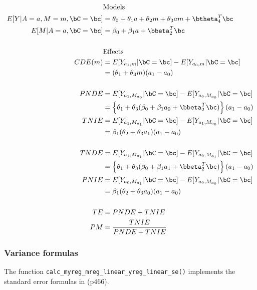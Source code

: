 \documentclass[dvipdfmx,10pt]{article}
\begin{document}
\begin{align*}
  &\text{Models}\\
  E[Y|A=a,M=m,\bC=\bc] &= \theta_{0} + \theta_{1}a + \theta_{2}m + \theta_{3}am + \btheta_{4}^{T}\bc\\
  E[M|A=a,\bC=\bc] &= \beta_{0} + \beta_{1}a + \bbeta_{2}^{T}\bc\\
  \\
  &\text{Effects}\\
  CDE(m) &= E[Y_{a_{1},m} | \bC = \bc] - E[Y_{a_{0},m} | \bC = \bc]\\
  &= (\theta_{1} + \theta_{3}m)(a_{1} - a_{0})\\
  \\
  PNDE &= E[Y_{a_{1},M_{a_{0}}} | \bC = \bc] - E[Y_{a_{0},M_{a_{0}}} | \bC = \bc]\\
  &= \left\{ \theta_{1} + \theta_{3}(\beta_{0} + \beta_{1}a_{0} + \bbeta_{2}^{T}\bc) \right\} (a_{1} - a_{0})\\
  TNIE &= E[Y_{a_{1},M_{a_{1}}} | \bC = \bc] - E[Y_{a_{1},M_{a_{0}}} | \bC = \bc]\\
  &= \beta_{1}(\theta_{2} + \theta_{3}a_{1})(a_{1} - a_{0})\\
  \\
  TNDE &= E[Y_{a_{1},M_{a_{1}}} | \bC = \bc] - E[Y_{a_{0},M_{a_{1}}} | \bC = \bc]\\
  &= \left\{ \theta_{1} + \theta_{3}(\beta_{0} + \beta_{1}a_{1} + \bbeta_{2}^{T}\bc) \right\} (a_{1} - a_{0})\\
  PNIE &= E[Y_{a_{0},M_{a_{1}}} | \bC = \bc] - E[Y_{a_{0},M_{a_{0}}} | \bC = \bc]\\
  &= \beta_{1}(\theta_{2} + \theta_{3}a_{0})(a_{1} - a_{0})\\
  \\
  TE &= PNDE + TNIE\\
  PM &= \frac{TNIE}{PNDE + TNIE}\\
\end{align*}

\subsubsection{Variance formulas}
\label{sec:org5b22bae}
The function \texttt{calc\_myreg\_mreg\_linear\_yreg\_linear\_se()} implements the standard error formulas in \cite{vanderweeleExplanationCausalInference2015} (p466).
\end{document}
